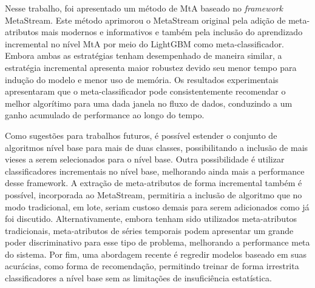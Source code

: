 \label{chap:conclusao}

Nesse trabalho, foi apresentado um método de MtA baseado no \textit{framework} MetaStream. Este método aprimorou o MetaStream original pela adição de meta-atributos mais modernos e informativos e também pela inclusão do aprendizado incremental no nível MtA por meio do LightGBM como meta-classificador. Embora ambas as estratégias tenham desempenhado de maneira similar, a estratégia incremental apresenta maior robustez devido seu menor tempo para indução do modelo e menor uso de memória. Os resultados experimentais apresentaram que o meta-classificador pode consistentemente recomendar o melhor algorítimo para uma dada janela no fluxo de dados, conduzindo a um ganho acumulado de performance ao longo do tempo.

Como sugestões para trabalhos futuros, é possível estender o conjunto de algoritmos nível base para mais de duas classes, possibilitando a inclusão de mais vieses a serem selecionados para o nível base. Outra possibilidade é utilizar classificadores incrementais no nível base, melhorando ainda mais a performance desse framework. A extração de meta-atributos de forma incremental também é possível, incorporada ao MetaStream, permitiria a inclusão de algoritmo que no modo tradicional, em lote, seriam custoso demais para serem adicionados como já foi discutido. Alternativamente, embora tenham sido utilizados meta-atributos tradicionais, meta-atributos de séries temporais podem apresentar um grande poder discriminativo para esse tipo de problema, melhorando a performance meta do sistema. Por fim, uma abordagem recente é regredir modelos baseado em suas acurácias, como forma de recomendação, permitindo treinar de forma irrestrita classificadores a nível base sem as limitações de insuficiência estatística.

